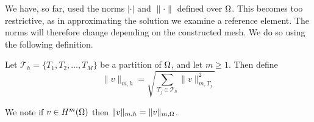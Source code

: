 We have, so far, used the norms $|\cdot|$ and $\|\cdot\|$ defined over $\Omega$. 
This becomes too restrictive, as in approximating the solution we examine a 
reference element. The norms will therefore change depending on the constructed 
mesh. We do so using the following definition.
\begin{defn}{\quad}
    Let $\mathcal{T}_h = \{ T_1,T_2,\ldots,T_M\}$ be a partition of $\Omega$, and 
    let $m\geq 1$. Then define 
    \begin{equation*}
        \|v\|_{m,h} = \sqrt{\sum_{T_j\in \mathcal{T}_h}\|v\|^2_{m,T_j}}
    \end{equation*}
\end{defn}
We note if $v\in H^m(\Omega)$ then $\|v\|_{m,h}=\|v\|_{m,\Omega}$.